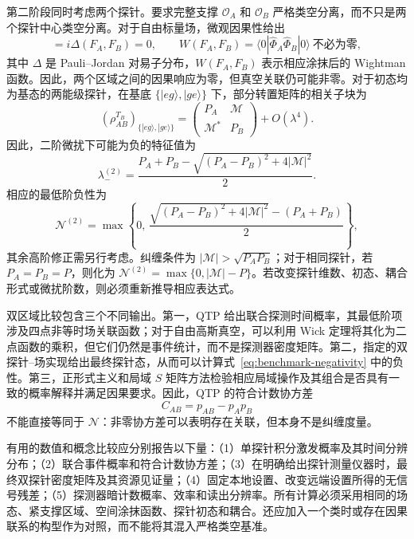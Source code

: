 \documentclass[UTF8,11pt,a4paper,fontset=none]{ctexart}
\begin{document}
第二阶段同时考虑两个探针。要求完整支撑 $\mathcal O_A$ 和 $\mathcal O_B$ 严格类空分离，而不只是两个探针中心类空分离。对于自由标量场，微观因果性给出
\begin{equation}
[\hat\Phi_A,\hat\Phi_B]
=i\Delta(F_A,F_B)=0,
\qquad
W(F_A,F_B)=\langle0|\hat\Phi_A\hat\Phi_B|0\rangle
\ \text{不必为零},
\label{eq:benchmark-spacelike}
\end{equation}
其中 $\Delta$ 是 Pauli--Jordan 对易子分布，$W(F_A,F_B)$ 表示相应涂抹后的 Wightman 函数。因此，两个区域之间的因果响应为零，但真空关联仍可能非零。对于初态均为基态的两能级探针，在基底 $\{|eg\rangle,|ge\rangle\}$ 下，部分转置矩阵的相关子块为
\begin{equation}
(\rho_{AB}^{T_B})_{\{|eg\rangle,|ge\rangle\}}
=\begin{pmatrix}P_A&\mathcal M\\\mathcal M^*&P_B\end{pmatrix}+O(\lambda^4).
\end{equation}
因此，二阶微扰下可能为负的特征值为
\begin{equation}
\lambda_-^{(2)}
=\frac{P_A+P_B-\sqrt{(P_A-P_B)^2+4|\mathcal M|^2}}{2}.
\end{equation}
相应的最低阶负性为
\begin{equation}
\mathcal N^{(2)}
=\max\!\left\{0,\,
\frac{\sqrt{(P_A-P_B)^2+4|\mathcal M|^2}-(P_A+P_B)}{2}
\right\},
\label{eq:benchmark-negativity}
\end{equation}
其余高阶修正需另行考虑。纠缠条件为 $|\mathcal M|>\sqrt{P_AP_B}$；对于相同探针，若 $P_A=P_B=P$，则化为 $\mathcal N^{(2)}=\max\{0,|\mathcal M|-P\}$。若改变探针维数、初态、耦合形式或微扰阶数，则必须重新推导相应表达式。

双区域比较包含三个不同输出。第一，QTP 给出联合探测时间概率，其最低阶项涉及四点非等时场关联函数；对于自由高斯真空，可以利用 Wick 定理将其化为二点函数的乘积，但它们仍然是事件统计，而不是探测器密度矩阵。第二，指定的双探针--场实现给出最终探针态，从而可以计算式~\eqref{eq:benchmark-negativity} 中的负性。第三，正形式主义和局域 $S$ 矩阵方法检验相应局域操作及其组合是否具有一致的概率解释并满足因果要求。因此，QTP 的符合计数协方差
\begin{equation}
C_{AB}=p_{AB}-p_Ap_B
\label{eq:benchmark-coincidence}
\end{equation}
不能直接等同于 $\mathcal N$：非零协方差可以表明存在关联，但本身不是纠缠度量。

有用的数值和概念比较应分别报告以下量：（1）单探针积分激发概率及其时间分辨分布；（2）联合事件概率和符合计数协方差；（3）在明确给出探针测量仪器时，最终双探针密度矩阵及其资源见证量；（4）固定本地设置、改变远端设置所得的无信号残差；（5）探测器暗计数概率、效率和读出分辨率。所有计算必须采用相同的场态、紧支撑区域、空间涂抹函数、探针初态和耦合。还应加入一个类时或存在因果联系的构型作为对照，而不能将其混入严格类空基准。
\end{document}
